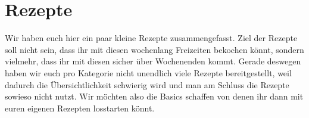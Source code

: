 \chapter{Rezepte}\label{ch:rezepte}
Wir haben euch hier ein paar kleine Rezepte zusammengefasst.
Ziel der Rezepte soll nicht sein, dass ihr mit diesen wochenlang Freizeiten bekochen könnt, sondern vielmehr, dass ihr mit diesen sicher über Wochenenden kommt.
Gerade deswegen haben wir euch pro Kategorie nicht unendlich viele Rezepte bereitgestellt, weil dadurch die Übersichtlichkeit schwierig wird und man am Schluss die Rezepte sowieso nicht nutzt.
Wir möchten also die Basics schaffen von denen ihr dann mit euren eigenen Rezepten losstarten könnt.




